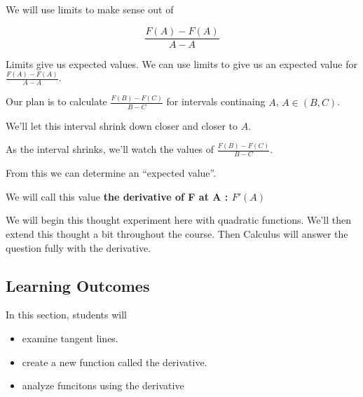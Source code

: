\documentclass{ximera}
\begin{document}
We will use limits to make sense out of 


\[
\frac{F(A) - F(A)}{A-A}
\]




Limits give us expected values. We can use limits to give us an expected value for $\frac{F(A) - F(A)}{A-A}$.



Our plan is to calculate $\frac{F(B) - F(C)}{B-C}$ for intervals continaing $A$, $A \in (B,C)$.

We'll let this interval shrink down closer and closer to $A$.

As the interval shrinks, we'll watch the values of $\frac{F(B) - F(C)}{B-C}$.

From this we can determine an ``expected value''.


We will call this value \textbf{the derivative of F at A : $F'(A)$}






















We will begin this thought experiment here with quadratic functions. We'll then extend this thought a bit throughout the course. Then Calculus will answer the question fully with the derivative.















\subsection*{Learning Outcomes}



\begin{sectionOutcomes}
In this section, students will 

\begin{itemize}
\item examine tangent lines.
\item create a new function called the derivative.
\item analyze funcitons using the derivative
\end{itemize}
\end{sectionOutcomes}
\end{document}
